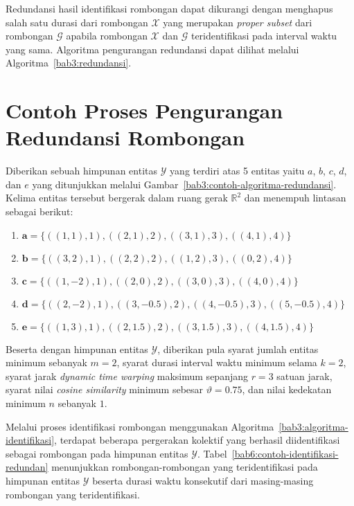 Redundansi hasil identifikasi rombongan dapat dikurangi dengan menghapus salah satu durasi dari rombongan $\mathcal{X}$ yang merupakan \textit{proper subset} dari rombongan $\mathcal{G}$ apabila rombongan $\mathcal{X}$ dan $\mathcal{G}$ teridentifikasi pada interval waktu yang sama. Algoritma pengurangan redundansi dapat dilihat melalui Algoritma~\ref{bab3:redundansi}.

\section{Contoh Proses Pengurangan Redundansi Rombongan}
\label{sec:redundancy-example}

Diberikan sebuah himpunan entitas $\mathcal{Y}$ yang terdiri atas 5 entitas yaitu $a$, $b$, $c$, $d$, dan $e$ yang ditunjukkan melalui Gambar~\ref{bab3:contoh-algoritma-redundansi}. Kelima entitas tersebut bergerak dalam ruang gerak $\mathbb{R}^2$ dan menempuh lintasan sebagai berikut:

\begin{enumerate}
    \item $\textbf{a} = \{ ((1, 1), 1), ((2, 1), 2), ((3, 1), 3), ((4, 1), 4) \}$
    \item $\textbf{b} = \{ ((3, 2), 1), ((2, 2), 2), ((1, 2), 3), ((0, 2), 4) \}$
    \item $\textbf{c} = \{ ((1, -2), 1), ((2, 0), 2), ((3, 0), 3), ((4, 0), 4) \}$
    \item $\textbf{d} = \{ ((2, -2), 1), ((3, -0.5), 2), ((4, -0.5), 3), ((5, -0.5), 4) \}$
    \item $\textbf{e} = \{ ((1, 3), 1), ((2, 1.5), 2), ((3, 1.5), 3), ((4, 1.5), 4) \}$
\end{enumerate}

Beserta dengan himpunan entitas $\mathcal{Y}$, diberikan pula syarat jumlah entitas minimum sebanyak $m = 2$, syarat durasi interval waktu minimum selama $k = 2$, syarat jarak \textit{dynamic time warping} maksimum sepanjang $r = 3$ satuan jarak, syarat nilai \textit{cosine similarity} minimum sebesar $\vartheta = 0.75$, dan nilai kedekatan minimum $n$ sebanyak $1$.

Melalui proses identifikasi rombongan menggunakan Algoritma~\ref{bab3:algoritma-identifikasi}, terdapat beberapa pergerakan kolektif yang berhasil diidentifikasi sebagai rombongan pada himpunan entitas $\mathcal{Y}$. Tabel~\ref{bab6:contoh-identifikasi-redundan} menunjukkan rombongan-rombongan yang teridentifikasi pada himpunan entitas $\mathcal{Y}$ beserta durasi waktu konsekutif dari masing-masing rombongan yang teridentifikasi.

